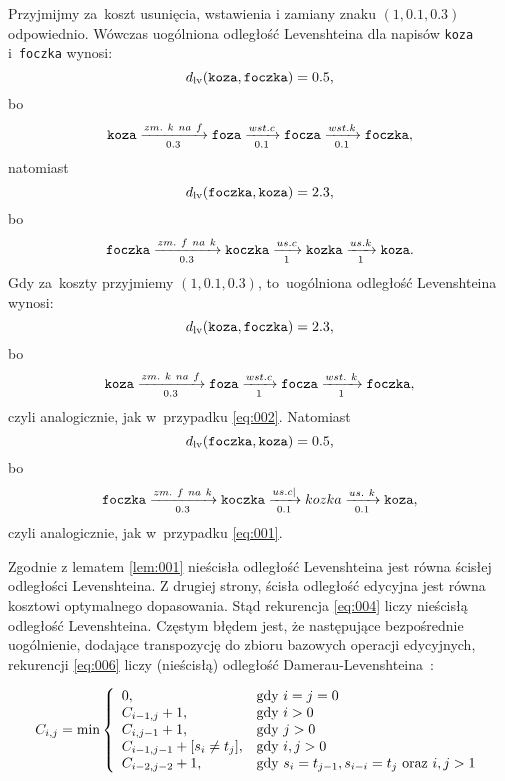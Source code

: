 \documentclass{praca1}
\begin{document}
\begin{example}
Przyjmijmy za~koszt usunięcia, wstawienia i zamiany znaku $(1, 0.1, 0.3)$ odpowiednio. Wówczas uogólniona odległość Levenshteina dla napisów \verb|koza| i~\verb|foczka| wynosi:
\begin{equation}
\label{eq:001}
d_{\mathrm{lv}}(\verb|koza|, \verb|foczka|) = 0.5,
\end{equation}
bo
$$
\verb|koza|  \xrightarrow[0.3]{zm.\ k\ na\ f} \verb|foza|  \xrightarrow[0.1]{wst. c} \verb|focza| \xrightarrow[0.1]{wst. k} \verb|foczka|,
$$
natomiast
\begin{equation}\label{eq:002}
d_{\mathrm{lv}}(\verb|foczka|, \verb|koza|) = 2.3,
\end{equation}
bo
$$
\verb|foczka|  \xrightarrow[0.3]{zm.\ f\ na\ k} \verb|koczka|  \xrightarrow[1]{us. c} \verb|kozka| \xrightarrow[1]{us. k} \verb|koza|.
$$
Gdy za~koszty przyjmiemy $(1, 0.1, 0.3)$, to~uogólniona odległość Levenshteina wynosi:
$$
d_{\mathrm{lv}}(\verb|koza|, \verb|foczka|) = 2.3,
$$
bo
$$
\verb|koza|  \xrightarrow[0.3]{zm.\ k\ na\ f} \verb|foza|  \xrightarrow[1]{wst. c} \verb|focza| \xrightarrow[1]{wst.\ k} \verb|foczka|,
$$
czyli analogicznie, jak w~przypadku \ref{eq:002}. Natomiast
$$
d_{\mathrm{lv}}(\verb|foczka|, \verb|koza|) = 0.5,
$$
bo
$$
\verb|foczka|  \xrightarrow[0.3]{zm.\ f\ na\ k} \verb|koczka|  \xrightarrow[0.1]{us. c|} kozka \xrightarrow[0.1]{us.\ k} \verb|koza|,
$$
czyli analogicznie, jak w~przypadku \ref{eq:001}.
\end{example}

Zgodnie z lematem \ref{lem:001} nieścisła odległość Levenshteina jest równa ścisłej odległości Levenshteina. Z drugiej strony, ścisła odległość edycyjna jest równa kosztowi optymalnego dopasowania. Stąd rekurencja \ref{eq:004} liczy nieścisłą odległość Levenshteina. Częstym błędem jest, że następujące bezpośrednie uogólnienie, dodające transpozycję do zbioru bazowych operacji edycyjnych, rekurencji \ref{eq:006} liczy (nieścisłą) odległość Damerau-Levenshteina~\cite{Boytsov2011:indexingmethods}:

\begin{equation}
\label{eq:007}
C_{i,j} = \min\left\{
\begin{array}{l l}     
    0, & \text{gdy } i = j = 0\\
    C_{i-1, j} + 1, & \text{gdy } i > 0 \\
    C_{i, j-1} + 1, & \text{gdy } j > 0 \\
    C_{i-1, j-1} + [s_{i}\neq t_{j}], & \text{gdy } i, j > 0 \\
    C_{i-2, j-2} + 1, & \text{gdy } s_i = t_{j-1}, s_{i-i} = t_j \text{ oraz } i,j > 1
\end{array}\right.
\end{equation}
\end{document}
